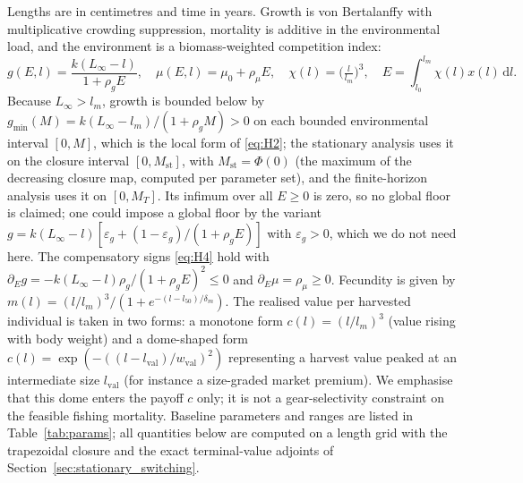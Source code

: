 \documentclass[pdflatex,sn-mathphys-num]{sn-jnl}
\newcommand{\dd}{\,\mathrm{d}}
\theoremstyle{plain}
\theoremstyle{definition}
\theoremstyle{remark}
\begin{document}
Lengths are in centimetres and time in years. Growth is von Bertalanffy with
multiplicative crowding suppression, mortality is additive in the environmental
load, and the environment is a biomass-weighted competition index:
\[
g(E,l)=\frac{k(L_\infty-l)}{1+\rho_g E},\quad
\mu(E,l)=\mu_0+\rho_\mu E,\quad
\chi(l)=\Big(\tfrac{l}{l_m}\Big)^{3},\quad
E=\int_{l_0}^{l_m}\chi(l)x(l)\dd l.
\]
Because $L_\infty>l_m$, growth is bounded below by
$g_{\min}(M)=k(L_\infty-l_m)/(1+\rho_g M)>0$ on each bounded environmental interval
$[0,M]$, which is the local form of \eqref{eq:H2}; the stationary analysis uses it
on the closure interval $[0,M_{\mathrm{st}}]$, with $M_{\mathrm{st}}=\Phi(0)$ (the
maximum of the decreasing closure map, computed per parameter set), and the
finite-horizon analysis uses it on $[0,M_T]$. Its infimum over all $E\ge0$ is zero,
so no global floor is claimed; one could impose a global floor by the variant
$g=k(L_\infty-l)[\varepsilon_g+(1-\varepsilon_g)/(1+\rho_gE)]$ with
$\varepsilon_g>0$, which we do not need here. The compensatory signs
\eqref{eq:H4} hold with
$\partial_Eg=-k(L_\infty-l)\rho_g/(1+\rho_gE)^2\le0$ and $\partial_E\mu=\rho_\mu\ge0$.
Fecundity is given by
$m(l)=(l/l_m)^3/(1+e^{-(l-l_{50})/\delta_m})$. The realised value per harvested
individual is taken in two forms: a monotone form $c(l)=(l/l_m)^3$ (value rising
with body weight) and a dome-shaped form
$c(l)=\exp(-((l-l_{\mathrm{val}})/w_{\mathrm{val}})^2)$ representing a harvest
value peaked at an intermediate size $l_{\mathrm{val}}$ (for instance a
size-graded market premium). We emphasise that this dome enters the payoff $c$
only; it is not a gear-selectivity constraint on the feasible fishing mortality.
Baseline parameters and ranges are listed in Table~\ref{tab:params}; all
quantities below are computed on a length grid with the trapezoidal closure and
the exact terminal-value adjoints of Section~\ref{sec:stationary_switching}.
\end{document}
